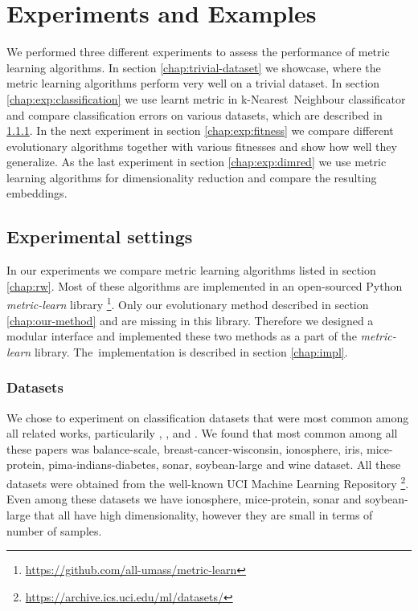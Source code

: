 \documentclass[12pt,a4paper]{report}
\begin{document}

\chapter{Experiments and Examples}
We performed three different experiments to assess the performance of metric learning algorithms. In section \ref{chap:trivial-dataset} we showcase, where the metric learning algorithms perform very well on a trivial dataset. In section \ref{chap:exp:classification} we use learnt metric in k-Nearest~Neighbour classificator and compare classification errors on various datasets, which are described in \ref{chap:exp:datasets}. In the next experiment in section \ref{chap:exp:fitness} we compare different evolutionary algorithms together with various fitnesses and show how well they generalize. As the last experiment in section \ref{chap:exp:dimred} we use metric learning algorithms for dimensionality reduction and compare the resulting embeddings.

\section{Experimental settings} 
In our experiments we compare metric learning algorithms listed in section \ref{chap:rw}. Most of these algorithms are implemented in an open-sourced Python \textit{metric-learn} library \footnote{\url{https://github.com/all-umass/metric-learn}}. Only our evolutionary method described in section \ref{chap:our-method} and \cite{fukui2013evolutionary} are missing in this library. Therefore we designed a modular interface and implemented these two methods as a part of the \textit{metric-learn} library. The~implementation is described in section \ref{chap:impl}.

\subsection{Datasets} \label{chap:exp:datasets}
We chose to experiment on classification datasets that were most common among all related works, particularily \cite{xing2002distance}, \cite{weinberger2009distance}, \cite{jacobgoldberger2004neighbourhood} and \cite{fukui2013evolutionary}. We found that most common among all these papers was balance-scale, breast-cancer-wisconsin, ionosphere, iris, mice-protein, pima-indians-diabetes, sonar, soybean-large and wine dataset. All these datasets were obtained from the well-known UCI Machine Learning Repository \footnote{\url{https://archive.ics.uci.edu/ml/datasets/}}. Even among these datasets we have ionosphere, mice-protein, sonar and soybean-large that all have high dimensionality, however they are small in terms of number of samples.
\end{document}
